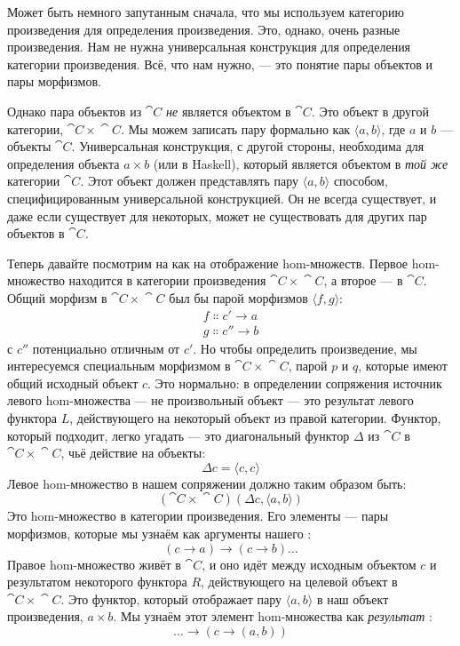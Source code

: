 \noindent
Может быть немного запутанным сначала, что мы используем категорию
произведения для определения произведения. Это, однако, очень разные
произведения. Нам не нужна универсальная конструкция для определения категории
произведения. Всё, что нам нужно, --- это понятие пары объектов и пары
морфизмов.

Однако пара объектов из $\cat{C}$ \emph{не} является объектом в
$\cat{C}$. Это объект в другой категории, $\cat{C}\times{}\cat{C}$. Мы можем
записать пару формально как $\langle a, b \rangle$,
где $a$ и $b$ --- объекты $\cat{C}$. Универсальная
конструкция, с другой стороны, необходима для определения
объекта $a\times{}b$ (или  в Haskell), который является объектом
в \emph{той же} категории $\cat{C}$. Этот объект должен
представлять пару $\langle a, b \rangle$ способом,
специфицированным универсальной конструкцией. Он не всегда существует, и
даже если существует для некоторых, может не существовать для других пар объектов
в $\cat{C}$.

Теперь давайте посмотрим на  как на отображение hom-множеств.
Первое hom-множество находится в категории произведения $\cat{C}\times{}\cat{C}$, а второе ---
в $\cat{C}$. Общий морфизм в $\cat{C}\times{}\cat{C}$ был бы парой
морфизмов $\langle f, g \rangle$:
\begin{gather*}
  f \Colon c' \to a \\
  g \Colon c'' \to b
\end{gather*}
с $c''$ потенциально отличным от
$c'$. Но чтобы определить произведение, мы интересуемся
специальным морфизмом в $\cat{C}\times{}\cat{C}$, парой $p$ и $q$, которые
имеют общий исходный объект $c$. Это нормально: в определении
сопряжения источник левого hom-множества --- не произвольный
объект --- это результат левого функтора $L$, действующего на некоторый
объект из правой категории. Функтор, который подходит, легко
угадать --- это диагональный функтор $\Delta$ из $\cat{C}$ в $\cat{C}\times{}\cat{C}$,
чьё действие на объекты:
\[\Delta c = \langle c, c \rangle\]
Левое hom-множество в нашем сопряжении должно таким образом быть:
\[(\cat{C}\times{}\cat{C})(\Delta c, \langle a, b \rangle)\]
Это hom-множество в категории произведения. Его элементы --- пары
морфизмов, которые мы узнаём как аргументы нашего :
\[(c \to a) \to (c \to b) \ldots{}\]
Правое hom-множество живёт в $\cat{C}$, и оно идёт между
исходным объектом $c$ и результатом некоторого функтора $R$,
действующего на целевой объект в $\cat{C}\times{}\cat{C}$. Это функтор, который отображает
пару $\langle a, b \rangle$ в наш объект произведения,
$a\times{}b$. Мы узнаём этот элемент hom-множества как
\emph{результат} :
\[\ldots{} \to (c \to (a, b))\]

